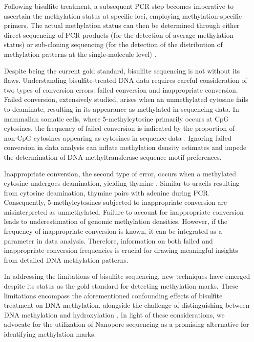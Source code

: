 Following bisulfite treatment, a subsequent PCR step becomes imperative to ascertain the methylation status at specific loci, employing methylation-specific primers. The actual methylation status can then be determined through either direct sequencing of PCR products (for the detection of average methylation status) or sub-cloning sequencing (for the detection of the distribution of methylation patterns at the single-molecule level) \citep{bisulfite2}.

Despite being the current gold standard, bisulfite sequencing is not without its flaws. Understanding bisulfite-treated DNA data requires careful consideration of two types of conversion errors: failed conversion and inappropriate conversion. Failed conversion, extensively studied, arises when an unmethylated cytosine fails to deaminate, resulting in its appearance as methylated in sequencing data. In mammalian somatic cells, where 5-methylcytosine primarily occurs at CpG cytosines, the frequency of failed conversion is indicated by the proportion of non-CpG cytosines appearing as cytosines in sequence data \citep{bisulfite_failed_conv}. Ignoring failed conversion in data analysis can inflate methylation density estimates and impede the determination of DNA methyltransferase sequence motif preferences.

Inappropriate conversion, the second type of error, occurs when a methylated cytosine undergoes deamination, yielding thymine \citep{bisulfite_inappr_conv}. Similar to uracils resulting from cytosine deamination, thymine pairs with adenine during PCR. Consequently, 5-methylcytosines subjected to inappropriate conversion are misinterpreted as unmethylated. Failure to account for inappropriate conversion leads to underestimation of genomic methylation densities. However, if the frequency of inappropriate conversion is known, it can be integrated as a parameter in data analysis. Therefore, information on both failed and inappropriate conversion frequencies is crucial for drawing meaningful insights from detailed DNA methylation patterns.

In addressing the limitations of bisulfite sequencing, new techniques have emerged despite its status as the gold standard for detecting methylation marks. These limitations encompass the aforementioned confounding effects of bisulfite treatment on DNA methylation, alongside the challenge of distinguishing between DNA methylation and hydroxylation \citep{ont_vs_bisulfite}. In light of these considerations, we advocate for the utilization of Nanopore sequencing as a promising alternative for identifying methylation marks.

